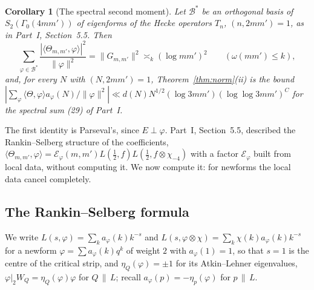 ﻿\documentclass[11pt]{amsart}
\newtheorem{corollary}[theorem]{Corollary}
\theoremstyle{remark}
\begin{document}
\begin{corollary}[The spectral second moment]\label{cor:spectral}
Let $\mathcal B^*$ be an orthogonal basis of $S_2(\Gamma_0(4mm'))$ of eigenforms of the Hecke operators $T_n$, $(n,2mm')=1$, as in Part~I, Section~5.5. Then
\[
\sum_{\varphi\in\mathcal B^*}\frac{|\langle\Theta_{m,m'},\varphi\rangle|^2}{\|\varphi\|^2}=\|G_{m,m'}\|^2\asymp_k(\log mm')^2\qquad(\omega(mm')\le k),
\]
and, for every $N$ with $(N,2mm')=1$, Theorem~\ref{thm:norm}(ii) is the bound $|\sum_\varphi\langle\Theta,\varphi\rangle a_\varphi(N)/\|\varphi\|^2|\ll d(N)N^{1/2}(\log3mm')(\log\log3mm')^C$ for the spectral sum (29) of Part~I.
\end{corollary}

The first identity is Parseval's, since $E\perp\varphi$. Part~I, Section~5.5, described the Rankin--Selberg structure of the coefficients, $\langle\Theta_{m,m'},\varphi\rangle=\mathcal E_\varphi(m,m')L(\frac12,f)L(\frac12,f\otimes\chi_{-4})$ with a factor $\mathcal E_\varphi$ built from local data, without computing it. We now compute it: for newforms the local data cancel completely.

\subsection{The Rankin--Selberg formula}\label{subsec:RS}
We write $L(s,\varphi)=\sum_ka_\varphi(k)k^{-s}$ and $L(s,\varphi\otimes\chi)=\sum_k\chi(k)a_\varphi(k)k^{-s}$ for a newform $\varphi=\sum a_\varphi(k)q^k$ of weight $2$ with $a_\varphi(1)=1$, so that $s=1$ is the centre of the critical strip, and $\eta_Q(\varphi)=\pm1$ for its Atkin--Lehner eigenvalues, $\varphi|_2W_Q=\eta_Q(\varphi)\varphi$ for $Q\,\|\,L$; recall $a_\varphi(p)=-\eta_p(\varphi)$ for $p\,\|\,L$.
\end{document}
